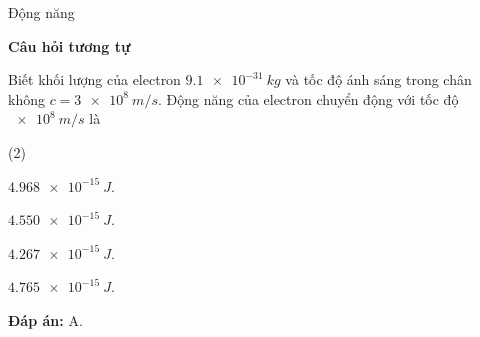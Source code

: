 \begin{dang}{Động năng}
{\begin{center}
	\textbf{Câu hỏi tương tự}
\end{center}

Biết khối lượng của electron $ \SI{9,1 e-31}{kg} $ và tốc độ ánh sáng trong chân không $ c = \SI{3 e8}{m/s} $. Động năng của electron chuyển động với tốc độ $ \SI{e8}{m/s} $ là
\begin{mcq}(2)
	\item $ \SI{4,968 e-15}{J} $.
	\item $ \SI{4,550 e-15}{J} $.
	\item $ \SI{4,267 e-15}{J} $.
	\item $ \SI{4,765 e-15}{J} $.
\end{mcq}
\textbf{Đáp án:} A.
}
		
\end{dang}





